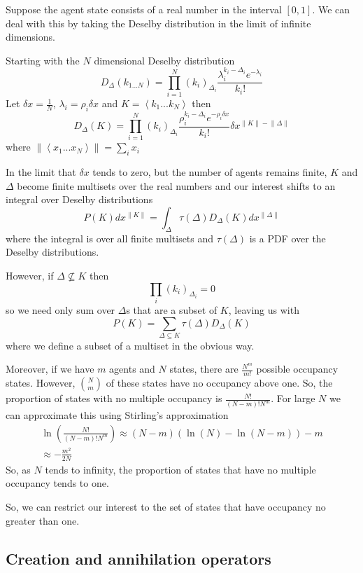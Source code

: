 \documentclass[letterpaper,twocolumn,10pt]{article}
\begin{document}
Suppose the agent state consists of a real number in the interval $[0,1]$. We can deal with this by taking the Deselby distribution in the limit of infinite dimensions.

Starting with the $N$ dimensional Deselby distribution
\[
D_\Delta(k_{1...N}) = \prod_{i=1}^N (k_i)_{\Delta_i}\frac{\lambda_i^{k_i-\Delta_i}e^{-\lambda_i}}{k_i!}
\]
Let $\delta x = \frac{1}{N}$, $\lambda_i = \rho_i \delta x$  and $K = \left< k_1...k_N \right>$ then
\begin{equation}
D_\Delta(K) = \prod_{i=1}^N (k_i)_{\Delta_i}\frac{\rho_i^{k_i-\Delta_i}e^{-\rho_i \delta x}}{k_i!} \delta x^{\lVert K\rVert - \lVert \Delta \rVert}
\label{continuousDeselby}
\end{equation}
where $\lVert \left<x_1...x_N \right> \rVert = \sum_i x_i$

In the limit that $\delta x$ tends to zero, but the number of agents remains finite, $K$ and $\Delta$ become finite multisets over the real numbers and our interest shifts to an integral over Deselby distributions
\[
P(K) dx^{\lVert K \rVert} = \int_\Delta \tau(\Delta) D_\Delta(K) dx^{\lVert\Delta \rVert}
\]
where the integral is over all finite multisets and $\tau(\Delta)$ is a PDF over the Deselby distributions.

However, if $\Delta \not\subseteq K$ then
\[
\prod_i(k_i)_{\Delta_i} = 0 
\]
so we need only sum over $\Delta$s that are a subset of $K$, leaving us with
\[
P(K) = \sum_{\Delta\subseteq K} \tau(\Delta) D_\Delta(K)
\]
where we define a subset of a multiset in the obvious way.

Moreover, if we have $m$ agents and $N$ states, there are $\frac{N^m}{m!}$ possible occupancy states. However, ${N \choose m}$ of these states have no occupancy above one. So, the proportion of states with no multiple occupancy is $\frac{N!}{(N-m)!N^m}$. For large $N$ we can approximate this using Stirling's approximation
\[
\begin{split}
\ln\left(\frac{N!}{(N-m)!N^m}\right) 
\approx (N-m)(\ln(N) - \ln(N-m)) - m \\
\approx -\frac{m^2}{2N}
\end{split}
\]
So, as $N$ tends to infinity, the proportion of states that have no multiple occupancy tends to one.

So, we can restrict our interest to the set of states that have occupancy no greater than one.

\subsection{Creation and annihilation operators}
\end{document}
